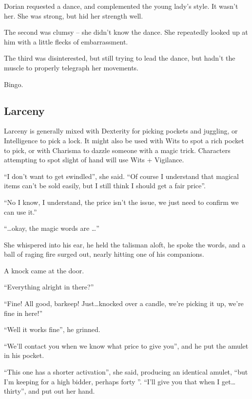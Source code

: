 \begin{multicols}{2}
\begin{exampletext}
  Dorian requested a dance, and complemented the young lady's style.
  It wasn't her.
  She was strong, but hid her strength well.

  The second was clumsy -- she didn't know the dance.
  She repeatedly looked up at him with a little flecks of embarrassment.

  The third was disinterested, but still trying to lead the dance, but hadn't the muscle to properly telegraph her movements.

  Bingo.
\end{exampletext}

\subsection{Larceny}

Larceny is generally mixed with Dexterity for picking pockets and juggling, or Intelligence to pick a lock.
It might also be used with Wits to spot a rich pocket to pick, or with Charisma to dazzle someone with a magic trick.
Characters attempting to spot slight of hand will use Wits + Vigilance.

\begin{exampletext}
  ``I don't want to get swindled'', she said.
  ``Of course I understand that magical items can't be sold easily, but I still think I should get a fair price''.

  ``No I know, I understand, the price isn't the issue, we just need to confirm we can use it.''

  ``\ldots okay, the magic words are \ldots''

  She whispered into his ear, he held the talisman aloft, he spoke the words, and a ball of raging fire surged out, nearly hitting one of his companions.

  A knock came at the door.

  ``Everything alright in there?''

  ``Fine!
  All good, barkeep!
  Just\ldots knocked over a candle, we're picking it up, we're fine in here!''

  ``Well it works fine'', he grinned.

  ``We'll contact you when we know what price to give you'', and he put the amulet in his pocket.

  ``This one has a shorter activation'', she said, producing an identical amulet, ``but I'm keeping for a high bidder, perhaps forty ''.
  ``I'll give you that when I get\ldots thirty'', and put out her hand.


\end{exampletext}
\end{multicols}
